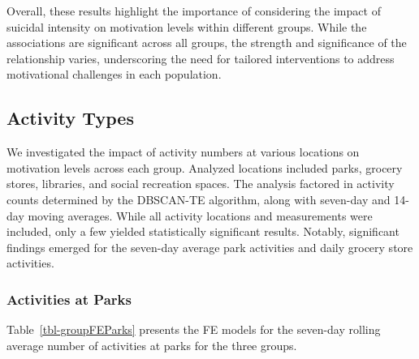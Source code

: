 \documentclass[
  letterpaper,
  number,
  review,
  3p]{elsarticle}
\begin{document}
Overall, these results highlight the importance of considering the
impact of suicidal intensity on motivation levels within different
groups. While the associations are significant across all groups, the
strength and significance of the relationship varies, underscoring the
need for tailored interventions to address motivational challenges in
each population.

\subsection{Activity Types}\label{activity-types}

We investigated the impact of activity numbers at various locations on
motivation levels across each group. Analyzed locations included parks,
grocery stores, libraries, and social recreation spaces. The analysis
factored in activity counts determined by the DBSCAN-TE algorithm, along
with seven-day and 14-day moving averages. While all activity locations
and measurements were included, only a few yielded statistically
significant results. Notably, significant findings emerged for the
seven-day average park activities and daily grocery store activities.

\subsubsection{Activities at Parks}\label{activities-at-parks}

Table~\ref{tbl-groupFEParks} presents the FE models for the seven-day
rolling average number of activities at parks for the three groups.
\end{document}
